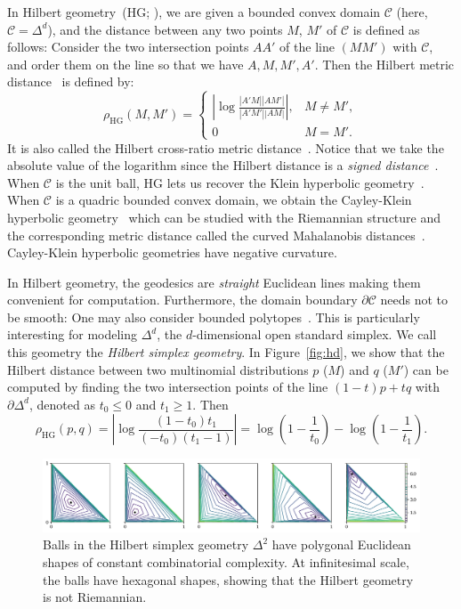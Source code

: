 \documentclass[graybox]{svmult}
\def\calC{\mathcal{C}}
\begin{document}
In Hilbert geometry~(HG; \cite{Hilbert-1895}), we are given a bounded convex domain $\calC$ (here, $\calC=\Delta^d$),
and the distance between any two points $M$, $M'$ of $\calC$ is defined as follows:
Consider the two intersection points $AA'$ of the line $(MM')$ with  $\calC$, and order them on the line so that we have $A,M,M',A'$. 
Then the Hilbert metric distance~\cite{Busemann-2011} is defined by:
\begin{equation}\label{eg:hgd}
\rho_{\mathrm{HG}}(M,M')=\left\{
\begin{array}{ll}
\left\vert\log\frac{|A'M| |AM'|}{|A'M'| |AM|}\right\vert, & M \not=M',\\
0 & M=M'.
\end{array}
\right.
\end{equation}
It is also called the Hilbert cross-ratio metric distance~\cite{HilbertHarpe-1991,BH-2014}.
Notice that we take the absolute value of the logarithm since the Hilbert distance is a {\em signed distance}~\cite{Richter-2011}.
When $\calC$ is the unit ball, HG lets us recover the Klein hyperbolic geometry~\cite{BH-2014}.
When $\calC$ is a quadric bounded convex domain, we obtain the Cayley-Klein hyperbolic geometry~\cite{CKM-2015}
which can be studied with the Riemannian structure and the corresponding metric distance called the curved Mahalanobis
distances~\cite{LMNN-2016,CayleyClassification-2016}.
Cayley-Klein hyperbolic geometries have negative curvature.

In Hilbert geometry, the geodesics are {\em straight} Euclidean lines making them convenient for computation.
Furthermore, the domain boundary $\partial\calC$ needs not to be smooth: One may also consider bounded polytopes~\cite{HGPolytope-2009}.
This is particularly interesting for modeling $\Delta^d$, the $d$-dimensional open standard simplex.
We call this geometry the \emph{Hilbert simplex geometry}.
In Figure~\ref{fig:hd}, we show that the Hilbert distance between two multinomial distributions
$p$ ($M$) and $q$ ($M'$) can be computed by
finding the two intersection points of the line $(1-t)p+tq$ with
$\partial\Delta^d$, denoted as $t_0\le0$ and $t_1\ge1$. Then 
$$
\rho_{\mathrm{HG}}(p,q)=\left\vert\log\frac{(1-t_0)t_1}{(-t_0)(t_1-1)}\right\vert
=\log\left(1-\frac{1}{t_0}\right)-\log\left(1-\frac{1}{t_1}\right).
$$

\begin{figure}[t]%
\centering
\includegraphics[width=\textwidth]{ball}
\caption{Balls in the  Hilbert simplex geometry $\Delta^2$ have polygonal Euclidean shapes of constant combinatorial complexity.
At infinitesimal scale, the balls have hexagonal shapes, showing that the Hilbert geometry is not Riemannian.}%
\label{fig:shape}%
\end{figure}
\end{document}
